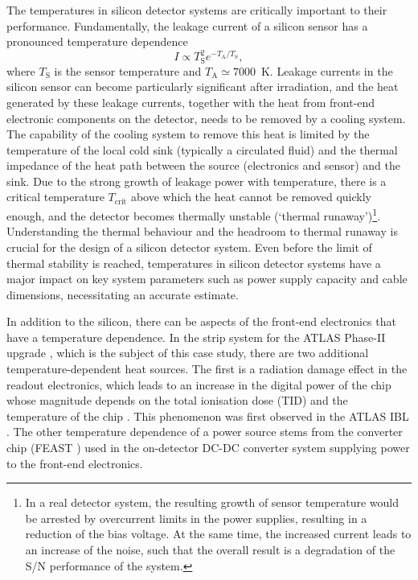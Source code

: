 The temperatures in silicon detector systems are critically important to their performance. Fundamentally, the leakage current of a silicon sensor has a pronounced temperature dependence 
\begin{equation}
I\propto T_\text{S}^2e^{-T_\text{A}/T_\text{S}},
\label{eq:leakage_current_temp_dependence}
\end{equation}
where $T_\text{S}$ is the sensor temperature and $T_\text{A}\simeq7000$~K. Leakage currents in the silicon sensor can become particularly significant after irradiation, and the heat generated by these leakage currents, together with the heat from front-end electronic components on the detector, needs to be removed by a cooling system. The capability of the cooling system to remove this heat is limited by the temperature of the local cold sink (typically a circulated fluid) and the thermal impedance of the heat path between the source (electronics and sensor) and the sink. Due to the strong growth of leakage power with temperature, there is a critical temperature $T_\text{crit}$ above which the heat cannot be removed quickly enough, and the detector becomes thermally unstable (`thermal runaway')\footnote{In a real detector system, the resulting growth of sensor temperature would be arrested by overcurrent limits in the power supplies, resulting in a reduction of the bias voltage. At the same time, the increased current leads to an increase of the noise, such that the overall result is a degradation of the S/N performance of the system.}. Understanding the thermal behaviour and the headroom to thermal runaway is crucial for the design of a silicon detector system. Even before the limit of thermal stability is reached, temperatures in silicon detector systems have a major impact on key system parameters such as power supply capacity and cable dimensions, necessitating an accurate estimate.

In addition to the silicon,
there can be aspects of the front-end electronics that have a temperature dependence. In the strip system for the ATLAS Phase-II upgrade \cite{Collaboration:2017mtb}, which is the subject of this case study, there are two additional temperature-dependent heat sources. The first is a radiation damage effect in the readout electronics, which leads to an increase in the digital power of the chip whose magnitude depends on the total ionisation dose (TID) and the temperature of the chip \cite{Collaboration:2017mtb}. This phenomenon was first observed in the ATLAS IBL \cite{ATL-INDET-PUB-2017-001}. The other temperature dependence of a power source stems from the converter chip (FEAST \cite{1748-0221-6-11-C11035}) used in the on-detector DC-DC converter system supplying power to the front-end electronics. 



